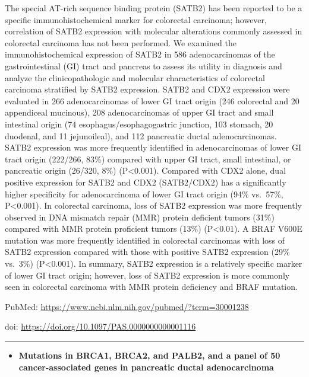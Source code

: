 \documentclass[]{article}
\providecommand{\tightlist}{%
  \setlength{\itemsep}{0pt}\setlength{\parskip}{0pt}}
\begin{document}
The special AT-rich sequence binding protein (SATB2) has been reported
to be a specific immunohistochemical marker for colorectal carcinoma;
however, correlation of SATB2 expression with molecular alterations
commonly assessed in colorectal carcinoma has not been performed. We
examined the immunohistochemical expression of SATB2 in 586
adenocarcinomas of the gastrointestinal (GI) tract and pancreas to
assess its utility in diagnosis and analyze the clinicopathologic and
molecular characteristics of colorectal carcinoma stratified by SATB2
expression. SATB2 and CDX2 expression were evaluated in 266
adenocarcinomas of lower GI tract origin (246 colorectal and 20
appendiceal mucinous), 208 adenocarcinomas of upper GI tract and small
intestinal origin (74 esophagus/esophagogastric junction, 103 stomach,
20 duodenal, and 11 jejunoileal), and 112 pancreatic ductal
adenocarcinomas. SATB2 expression was more frequently identified in
adenocarcinomas of lower GI tract origin (222/266, 83\%) compared with
upper GI tract, small intestinal, or pancreatic origin (26/320, 8\%)
(P\textless{}0.001). Compared with CDX2 alone, dual positive expression
for SATB2 and CDX2 (SATB2/CDX2) has a significantly higher specificity
for adenocarcinoma of lower GI tract origin (94\% vs.~57\%,
P\textless{}0.001). In colorectal carcinoma, loss of SATB2 expression
was more frequently observed in DNA mismatch repair (MMR) protein
deficient tumors (31\%) compared with MMR protein proficient tumors
(13\%) (P\textless{}0.01). A BRAF V600E mutation was more frequently
identified in colorectal carcinomas with loss of SATB2 expression
compared with those with positive SATB2 expression (29\% vs.~3\%)
(P\textless{}0.001). In summary, SATB2 expression is a relatively
specific marker of lower GI tract origin; however, loss of SATB2
expression is more commonly seen in colorectal carcinoma with MMR
protein deficiency and BRAF mutation.

PubMed: \url{https://www.ncbi.nlm.nih.gov/pubmed/?term=30001238}

doi: \url{https://doi.org/10.1097/PAS.0000000000001116}

{}

{}

\begin{center}\rule{0.5\linewidth}{\linethickness}\end{center}

\begin{itemize}
\tightlist
\item
  \textbf{Mutations in BRCA1, BRCA2, and PALB2, and a panel of 50
  cancer-associated genes in pancreatic ductal adenocarcinoma}
\end{itemize}
\end{document}
